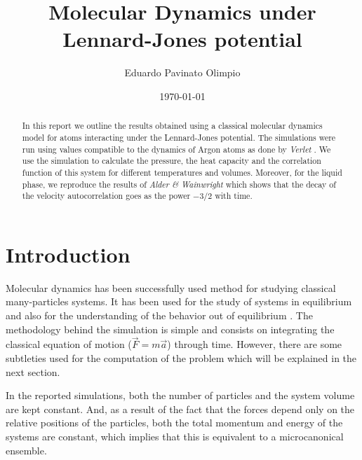 \documentclass[aps,prl,reprint,groupedaddress]{revtex4-1}
\begin{document}
\title{Molecular Dynamics under Lennard-Jones potential}


\author{Eduardo Pavinato Olimpio}


\date{\today}

\begin{abstract}
	In this report we outline the results obtained using a classical molecular dynamics model for atoms interacting under the Lennard-Jones potential. The simulations were run using values compatible to the dynamics of Argon atoms as done by \textit{Verlet} \cite{Verlet1967}. We use the simulation to calculate the pressure, the heat capacity and the correlation function of this system for different temperatures and volumes. Moreover, for the liquid phase, we reproduce the results of \textit{Alder \& Wainwright} \cite{Alder1970} which shows that the decay of the velocity autocorrelation goes as the power $-3/2$ with time.
\end{abstract}

\maketitle

\section{Introduction}
Molecular dynamics has been successfully used method for studying classical many-particles systems. It has been used for the study of systems in equilibrium and also for the understanding of the behavior out of equilibrium \cite{RapaportBook}. The methodology behind the simulation is simple and consists on integrating the classical equation of motion ($\vec{F} = m\vec{a}$) through time. However, there are some subtleties used for the computation of the problem which will be explained in the next section.

In the reported simulations, both the number of particles and the system volume are kept constant. And, as a result of the fact that the forces depend only on the relative positions of the particles, both the total momentum and energy of the systems are  constant, which implies that this is equivalent to a microcanonical ensemble.
\end{document}
